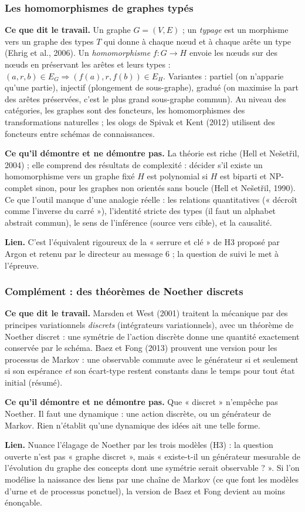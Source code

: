 \documentclass[a4paper,11pt]{article}
\newcommand{\cours}[1]{\par\smallskip\textbf{\textsf{#1}}\enspace}
\begin{document}
\subsubsection{Les homomorphismes de graphes typés}
\cours{Ce que dit le travail.} Un graphe $G=(V,E)$ ; un \emph{typage} est un morphisme vers un graphe des types $T$ qui donne à chaque nœud et à chaque arête un type (Ehrig et al., 2006). Un \emph{homomorphisme} $f:G\to H$ envoie les nœuds sur des nœuds en préservant les arêtes et leurs types : $(a,r,b)\in E_G\Rightarrow(f(a),r,f(b))\in E_H$. Variantes : partiel (on n'apparie qu'une partie), injectif (plongement de sous-graphe), gradué (on maximise la part des arêtes préservées, c'est le plus grand sous-graphe commun). Au niveau des catégories, les graphes sont des foncteurs, les homomorphismes des transformations naturelles ; les ologs de Spivak et Kent (2012) utilisent des foncteurs entre schémas de connaissances.
\cours{Ce qu'il démontre et ne démontre pas.} La théorie est riche (Hell et Nešetřil, 2004) ; elle comprend des résultats de complexité : décider s'il existe un homomorphisme vers un graphe fixé $H$ est polynomial si $H$ est biparti et NP-complet sinon, pour les graphes non orientés sans boucle (Hell et Nešetřil, 1990). Ce que l'outil manque d'une analogie réelle : les relations quantitatives (« décroît comme l'inverse du carré »), l'identité stricte des types (il faut un alphabet abstrait commun), le sens de l'inférence (source vers cible), et la causalité.
\cours{Lien.} C'est l'équivalent rigoureux de la « serrure et clé » de H3 proposé par Argon et retenu par le directeur au message 6 ; la question de suivi le met à l'épreuve.

\subsubsection{Complément : des théorèmes de Noether discrets}
\cours{Ce que dit le travail.} Marsden et West (2001) traitent la mécanique par des principes variationnels \emph{discrets} (intégrateurs variationnels), avec un théorème de Noether discret : une symétrie de l'action discrète donne une quantité exactement conservée par le schéma. Baez et Fong (2013) prouvent une version pour les processus de Markov : une observable commute avec le générateur si et seulement si son espérance \emph{et} son écart-type restent constants dans le temps pour tout état initial (résumé).
\cours{Ce qu'il démontre et ne démontre pas.} Que « discret » n'empêche pas Noether. Il faut une dynamique : une action discrète, ou un générateur de Markov. Rien n'établit qu'une dynamique des idées ait une telle forme.
\cours{Lien.} Nuance l'élagage de Noether par les trois modèles (H3) : la question ouverte n'est pas « graphe discret », mais « existe-t-il un générateur mesurable de l'évolution du graphe des concepts dont une symétrie serait observable ? ». Si l'on modélise la naissance des liens par une chaîne de Markov (ce que font les modèles d'urne et de processus ponctuel), la version de Baez et Fong devient au moins énonçable.
\end{document}
